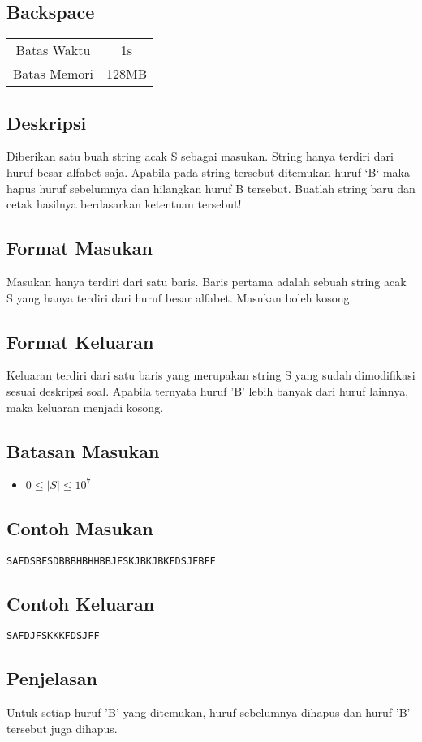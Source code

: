 \documentclass{article}
\begin{document}
\begin{center}
    \section*{Backspace} %

    \begin{tabular}{ | c c | }
        \hline
        Batas Waktu  & 1s \\    %
        Batas Memori & 128MB \\  %
        \hline
    \end{tabular}
\end{center}

\subsection*{Deskripsi}
Diberikan satu buah string acak S sebagai masukan. String hanya terdiri dari huruf besar alfabet saja. Apabila pada string tersebut ditemukan huruf `B` maka hapus huruf sebelumnya dan hilangkan huruf B tersebut. Buatlah string baru dan cetak hasilnya berdasarkan ketentuan tersebut!

\subsection*{Format Masukan}
Masukan hanya terdiri dari satu baris. Baris pertama adalah sebuah string acak S yang hanya terdiri dari huruf besar alfabet. Masukan boleh kosong.

\subsection*{Format Keluaran}
Keluaran terdiri dari satu baris yang merupakan string S yang sudah dimodifikasi sesuai deskripsi soal. Apabila ternyata huruf 'B' lebih banyak dari huruf lainnya, maka keluaran menjadi kosong.

\subsection*{Batasan Masukan}
\begin{itemize}
 \item $0 \leq |S|  \leq 10^7$
\end{itemize}

\begin{multicols}{2}
\subsection*{Contoh Masukan}
\begin{lstlisting}
SAFDSBFSDBBBHBHHBBJFSKJBKJBKFDSJFBFF
\end{lstlisting}
\null
\columnbreak
\subsection*{Contoh Keluaran}
\begin{lstlisting}
SAFDJFSKKKFDSJFF
\end{lstlisting}
\vfill
\null
\end{multicols}

\subsection*{Penjelasan}
Untuk setiap huruf 'B' yang ditemukan, huruf sebelumnya dihapus dan huruf 'B' tersebut juga dihapus.
\end{document}
